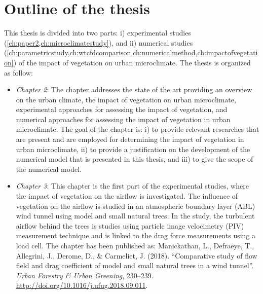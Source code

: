 \section{Outline of the thesis}

This thesis is divided into two parts: i) experimental studies (\cref{ch:paper2,ch:microclimatestudy}), and ii) numerical studies (\cref{ch:parametricstudy,ch:wtcfdcomparison,ch:numericalmethod,ch:impactofvegetation}) of the impact of vegetation on urban microclimate. The thesis is organized as follow:
\begin{itemize}
	\item \textit{Chapter 2}: The chapter addresses the state of the art providing an overview on the urban climate, the impact of vegetation on urban microclimate, experimental approaches for assessing the impact of vegetation, and numerical approaches for assessing the impact of vegetation in urban microclimate. The goal of the chapter is: i) to provide relevant researches that are present and are employed for determining the impact of vegetation in urban microclimate, ii) to provide a justification on the development of the numerical model that is presented in this thesis, and iii) to give the scope of the numerical model. 

	\item \textit{Chapter 3}: This chapter is the first part of the experimental studies, where the impact of vegetation on the airflow is investigated. The influence of vegetation on the airflow is studied in an atmospheric boundary layer (ABL) wind tunnel using model and small natural trees. In the study, the turbulent airflow behind the trees is studies using particle image velocimetry (PIV) measurement technique and is linked to the drag force measurements using a load cell. The chapter has been published as: Manickathan, L., Defraeye, T., Allegrini, J., Derome, D., \& Carmeliet, J. (2018). ``Comparative study of flow field and drag coefficient of model and small natural trees in a wind tunnel''. \textit{Urban Forestry \& Urban Greening}, 230–239. \url{http://doi.org/10.1016/j.ufug.2018.09.011}.
	

\end{itemize}
